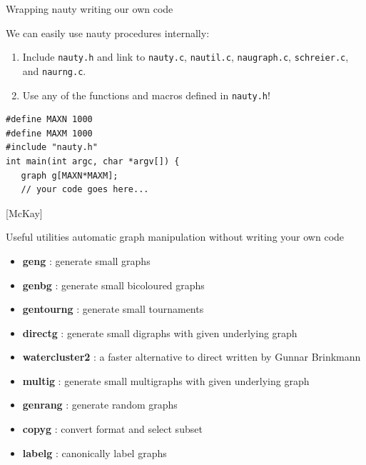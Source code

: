 \documentclass{beamer}
\begin{document}
\begin{frame}[fragile] {Wrapping nauty}
{writing our own code}

We can easily use nauty procedures internally:

\bigskip

\begin{enumerate}
\item 
Include {\tt nauty.h} and link to {\tt nauty.c}, {\tt nautil.c}, {\tt naugraph.c}, {\tt schreier.c}, and {\tt naurng.c}.
\item 
Use any of the functions and macros defined in {\tt nauty.h}!
\end{enumerate}

\begin{lstlisting}[frame=single]
#define MAXN 1000 
#define MAXM 1000 
#include "nauty.h" 
int main(int argc, char *argv[]) {
   graph g[MAXN*MAXM];
   // your code goes here...
\end{lstlisting}
[McKay]

\end{frame}


\begin{frame}[fragile] {Useful utilities}
{automatic graph manipulation without writing your own code}

\bigskip

\begin{itemize}
\item 
\textbf{geng} : generate small graphs
\item 
\textbf{genbg} : generate small bicoloured graphs
\item 
\textbf{gentourng} : generate small tournaments
\item 
\textbf{directg} : generate small digraphs with given underlying graph
\item 
\textbf{watercluster2} : a faster alternative to direct written by Gunnar Brinkmann
\item 
\textbf{multig} : generate small multigraphs with given underlying graph
\item 
\textbf{genrang} : generate random graphs
\item 
\textbf{copyg} : convert format and select subset
\item 
\textbf{labelg} : canonically label graphs
\end{itemize}

\end{frame}
\end{document}
